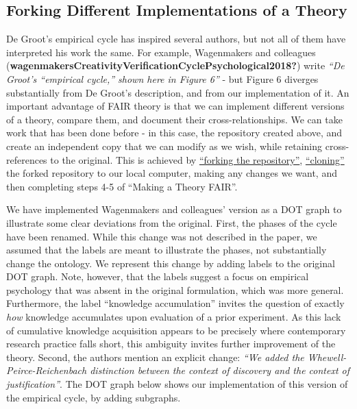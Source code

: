 \documentclass[
  man,floatsintext]{apa6}
\begin{document}
\subsection{Forking Different Implementations of a Theory}\label{forking-different-implementations-of-a-theory}

De Groot's empirical cycle has inspired several authors,
but not all of them have interpreted his work the same.
For example, Wagenmakers and colleagues (\textbf{wagenmakersCreativityVerificationCyclePsychological2018?}) write \emph{``De Groot's ``empirical cycle,'' shown here in Figure 6''} - but Figure 6 diverges substantially from De Groot's description, and from our implementation of it.
An important advantage of FAIR theory is that we can implement different versions of a theory, compare them, and document their cross-relationships.
We can take work that has been done before - in this case, the repository created above, and create an independent copy that we can modify as we wish, while retaining cross-references to the original.
This is achieved by \href{https://docs.github.com/en/pull-requests/collaborating-with-pull-requests/working-with-forks/fork-a-repo}{``forking the repository''},
\href{https://docs.github.com/en/pull-requests/collaborating-with-pull-requests/working-with-forks/fork-a-repo}{``cloning''} the forked repository to our local computer,
making any changes we want, and then completing steps 4-5 of ``Making a Theory FAIR''.

We have implemented Wagenmakers and colleagues' version as a DOT graph
to illustrate some clear deviations from the original.
First, the phases of the cycle have been renamed.
While this change was not described in the paper,
we assumed that the labels are meant to illustrate the phases, not substantially change the ontology.
We represent this change by adding labels to the original DOT graph.
Note, however, that the labels suggest a focus on empirical psychology that was absent in the original formulation, which was more general.
Furthermore, the label ``knowledge accumulation'' invites the question of exactly \emph{how} knowledge accumulates upon evaluation of a prior experiment.
As this lack of cumulative knowledge acquisition appears to be precisely where contemporary research practice falls short, this ambiguity invites further improvement of the theory.
Second, the authors mention an explicit change: \emph{``We added the Whewell-Peirce-Reichenbach distinction between the context of discovery and the context of justification''}.
The DOT graph below shows our implementation of this version of the empirical cycle, by adding subgraphs.
\end{document}
